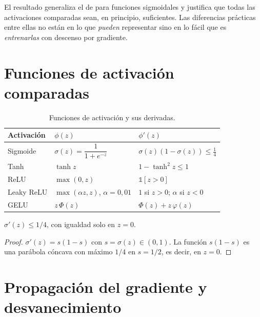 El resultado generaliza el de \textcite{cybenko1989} para funciones sigmoidales y justifica que todas las activaciones comparadas sean, en principio, suficientes. Las diferencias prácticas entre ellas no están en lo que \emph{pueden} representar sino en lo fácil que es \emph{entrenarlas} con descenso por gradiente.

\section{Funciones de activación comparadas}

\begin{table}[ht]
\centering
\caption{Funciones de activación y sus derivadas.}
\label{tab:activaciones}
\renewcommand{\arraystretch}{1.4}
\begin{tabular}{@{}lll@{}}
\toprule
Activación & $\phi(z)$ & $\phi'(z)$ \\
\midrule
Sigmoide & $\sigma(z) = \dfrac{1}{1+e^{-z}}$ & $\sigma(z)(1-\sigma(z)) \le \tfrac14$ \\
Tanh & $\tanh z$ & $1-\tanh^2 z \le 1$ \\
ReLU & $\max(0,z)$ & $\mathbb{1}[z>0]$ \\
Leaky ReLU & $\max(\alpha z, z)$, $\alpha = 0{,}01$ & $1$ si $z>0$; $\alpha$ si $z<0$ \\
GELU & $z\,\Phi(z)$ & $\Phi(z) + z\,\varphi(z)$ \\
\bottomrule
\end{tabular}
\end{table}

\begin{proposicion}
$\sigma'(z) \le 1/4$, con igualdad solo en $z = 0$.
\end{proposicion}
\begin{proof}
$\sigma'(z) = s(1-s)$ con $s = \sigma(z)\in(0,1)$. La función $s(1-s)$ es una parábola cóncava con máximo $1/4$ en $s = 1/2$, es decir, en $z=0$.
\end{proof}


\section{Propagación del gradiente y desvanecimiento}

